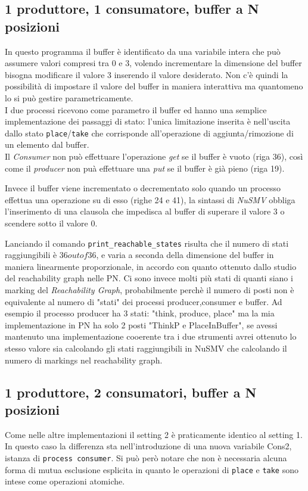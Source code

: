 \documentclass[a4paper]{article}
\begin{document}
\subsection{1 produttore, 1 consumatore, buffer a N posizioni}

In questo programma il buffer è identificato da una variabile intera che può assumere valori compresi tra 0 e 3, volendo incrementare la dimensione del buffer bisogna modificare il valore 3 inserendo il valore desiderato.
Non c'è quindi la possibilità di impostare il valore del buffer in maniera interattiva ma quantomeno lo si può gestire parametricamente.\\
I due processi ricevono come parametro il buffer ed hanno una semplice implementazione dei passaggi di stato: l'unica limitazione inserita è nell'uscita dallo stato \texttt{place}/\texttt{take} che corrisponde all'operazione di aggiunta/rimozione di un elemento dal buffer.\\
Il \textit{Consumer} non può effettuare l'operazione \textit{get} se il buffer è vuoto (riga 36), così come il \textit{producer} non puà effettuare una \textit{put} se il buffer è già pieno (riga 19).

Invece il buffer viene incrementato o decrementato solo quando un processo effettua una operazione su di esso (righe 24 e 41), la sintassi di \textit{NuSMV} obbliga l'inserimento di una clausola che impedisca al buffer di superare il valore 3 o scendere sotto il valore 0.

Lanciando il comando \texttt{print\_reachable\_states} risulta che il numero di stati raggiungibili è $36 out of 36$, e varia a seconda della dimensione del buffer in maniera linearmente proporzionale, in accordo con quanto ottenuto dallo studio del reachability graph nelle PN.
Ci sono invece molti più stati di quanti siano i marking del \textit{Reachability Graph}, probabilmente perchè il numero di posti non è equivalente al numero di "stati" dei processi producer,consumer e buffer.
Ad esempio il processo producer ha 3 stati: "think, produce, place" ma la mia implementazione in PN ha solo 2 posti "ThinkP e PlaceInBuffer", se avessi mantenuto una implementazione cooerente tra i due strumenti avrei ottenuto lo stesso valore sia calcolando gli stati raggiungibili in NuSMV che calcolando il numero di markings nel reachability graph.
\newpage
\subsection{1 produttore, 2 consumatori, buffer a N posizioni}

Come nelle altre implementazioni il setting 2 è praticamente identico al setting 1. In questo caso la differenza sta nell'introduzione di una nuova variabile Cons2, istanza di \texttt{process consumer}.
Si può però notare che non è necessaria alcuna forma di mutua esclusione esplicita in quanto le operazioni di \texttt{place} e \texttt{take} sono intese come operazioni atomiche.
\end{document}
